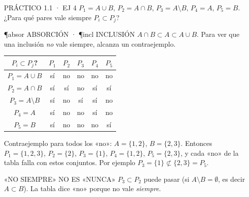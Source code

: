 \begin{enunciado}{PRÁCTICO 1.1 · EJ 4}
$P_1=A\cup B$, $P_2=A\cap B$, $P_3=A\setminus B$, $P_4=A$, $P_5=B$. ¿Para qué pares vale siempre $P_i\subset P_j$?
\end{enunciado}
\begin{uso}{\P{absor} ABSORCIÓN · \P{incl} INCLUSIÓN}
$A\cap B\subset A\subset A\cup B$. Para ver que una inclusión \emph{no} vale siempre, alcanza un contraejemplo.
\end{uso}
\begin{center}\small
\begin{tabular}{@{}c|ccccc@{}}
$P_i\subset P_j$? & $P_1$ & $P_2$ & $P_3$ & $P_4$ & $P_5$\\\midrule
$P_1=A\cup B$ & sí & no & no & no & no\\
$P_2=A\cap B$ & sí & sí & no & sí & sí\\
$P_3=A\setminus B$ & sí & no & sí & sí & no\\
$P_4=A$ & sí & no & no & sí & no\\
$P_5=B$ & sí & no & no & no & sí
\end{tabular}
\end{center}
Contraejemplo para todos los «no»: $A=\{1,2\}$, $B=\{2,3\}$. Entonces $P_1=\{1,2,3\}$, $P_2=\{2\}$, $P_3=\{1\}$, $P_4=\{1,2\}$, $P_5=\{2,3\}$, y cada «no» de la tabla falla con estos conjuntos. Por ejemplo $P_3=\{1\}\not\subset\{2,3\}=P_5$.
\begin{trampa}{«NO SIEMPRE» NO ES «NUNCA»}
$P_3\subset P_2$ puede pasar (si $A\setminus B=\emptyset$, es decir $A\subset B$). La tabla dice «no» porque no vale \emph{siempre}.
\end{trampa}

